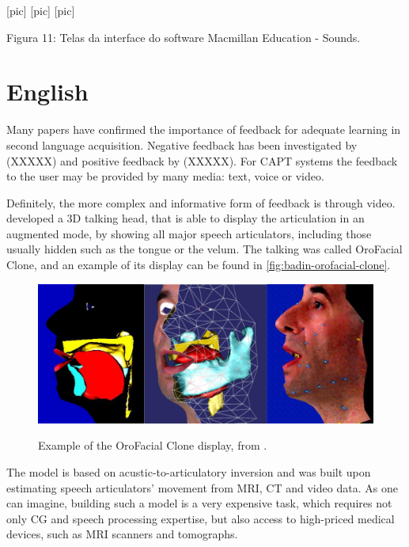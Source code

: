                          [pic]  [pic]  [pic]

Figura 11: Telas da interface do software Macmillan Education - Sounds.

\section{English}

Many papers have confirmed the importance of feedback for adequate learning in second language
acquisition. Negative feedback has been investigated by (XXXXX) and positive feedback by (XXXXX).
For \ac{CAPT} systems the feedback to the user may be provided by many media: text, voice or video.

Definitely, the more complex and informative form of feedback is through video. \citeauthor{Badin2010} \citep{Badin2010}
developed a 3D talking head, that is able to display the articulation in an augmented mode,
by showing all major speech articulators, including those usually hidden such as the tongue or the velum. The talking
was called OroFacial Clone, and an example of its display can be found in \autoref{fig:badin-orofacial-clone}.

\begin{figure}[!htb]
        \myfloatalign
        {\includegraphics[width=.66\linewidth]{gfx/badin-orofacial-clone.png}}
        \caption{Example of the OroFacial Clone display, from \citeauthor{Badin2010} \citep{Badin2010}.}
        \label{fig:badin-orofacial-clone}
\end{figure}

The model is based on acustic-to-articulatory inversion and was built upon estimating speech articulators' 
movement from \ac{MRI}, \ac{CT} and video data. As one can imagine, building such a model is a very expensive task, which 
requires not only \ac{CG} and speech processing expertise, but also access to high-priced medical devices, such as 
\ac{MRI} scanners and tomographs. 


